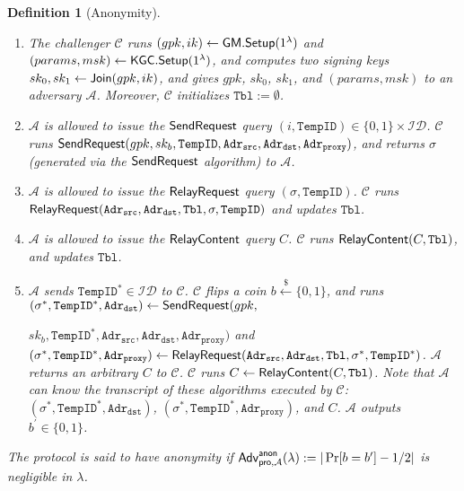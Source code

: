 \documentclass[preprint]{sig-alternate}
\newtheorem{definition}{Definition}[section]
\begin{document}
\begin{definition}[Anonymity]~\label{def:anon}
\begin{enumerate}
\setlength{\itemsep}{0em}\setlength{\parsep}{0em}
\item The challenger $\mathcal{C}$ runs $(gpk,ik)\leftarrow{\sf GM.Setup}(1^\lambda)$ and $(params,msk)\leftarrow {\sf KGC.Setup}(1^\lambda)$, and computes two signing keys $sk_0,sk_1\leftarrow {\sf Join}(gpk,ik)$, 
and gives $gpk$, $sk_0$, $sk_1$, and $(params,msk)$ to an adversary $\mathcal{A}$. Moreover, $\mathcal{C}$ initializes $\mathtt{Tbl}:=\emptyset$. 

\item $\mathcal{A}$ is allowed to issue the ${\sf SendRequest}$ query $(i,\mathtt{TempID})\allowbreak \in\{0,1\}\times\mathcal{ID}$. $\mathcal{C}$ runs ${\sf SendRequest}(gpk,\allowbreak sk_b,\mathtt{TempID},\allowbreak \mathtt{Adr_{src}},\allowbreak \mathtt{Adr_{dst}},\mathtt{Adr_{proxy}})$, and returns $\sigma$ (generated via the ${\sf SendRequest}$ algorithm) to $\mathcal{A}$. 

\item $\mathcal{A}$ is allowed to issue the ${\sf RelayRequest}$ query $(\sigma,\mathtt{TempID})$. $\mathcal{C}$ runs ${\sf RelayRequest}(\mathtt{Adr_{src}},\allowbreak \mathtt{Adr_{dst}},\allowbreak \mathtt{Tbl},\allowbreak \sigma, \mathtt{TempID})$ and updates $\mathtt{Tbl}$.  

\item $\mathcal{A}$ is allowed to issue the ${\sf RelayContent}$ query $C$. $\mathcal{C}$ runs ${\sf RelayContent}(C,\allowbreak \mathtt{Tbl})$, and updates $\mathtt{Tbl}$. 

\item $\mathcal{A}$ sends $\mathtt{TempID}^\ast\in\mathcal{ID}$ to $\mathcal{C}$. 
$\mathcal{C}$ flips a coin $b\stackrel{\$}{\leftarrow}\{0,1\}$, and runs $(\sigma^\ast,\mathtt{TempID}^\ast,\allowbreak \mathtt{Adr_{dst}})\leftarrow{\sf SendRequest}(gpk,$

\noindent$sk_b,\mathtt{TempID}^\ast,\mathtt{Adr_{src}},\allowbreak \mathtt{Adr_{dst}},\allowbreak \mathtt{Adr_{proxy}})$ and $(\sigma^\ast,\allowbreak \mathtt{TempID}^\ast,\allowbreak \mathtt{Adr_{proxy}})\leftarrow{\sf RelayRequest}(\mathtt{Adr_{src}},\allowbreak \mathtt{Adr_{dst}},\mathtt{Tbl},\allowbreak \sigma^\ast, \mathtt{TempID}^\ast)$. 
$\mathcal{A}$ returns an arbitrary $C$ to $\mathcal{C}$. 
$\mathcal{C}$ runs $C\leftarrow{\sf RelayContent}(C,\allowbreak \mathtt{Tbl})$. 
Note that $\mathcal{A}$ can know the transcript of these algorithms executed by $\mathcal{C}$: $(\sigma^\ast,\mathtt{TempID}^\ast,\mathtt{Adr_{dst}})$, $(\sigma^\ast,\allowbreak \mathtt{TempID}^\ast,\allowbreak \mathtt{Adr_{proxy}})$, and $C$. 
$\mathcal{A}$ outputs $b^\prime\in\{0,1\}$. 
\end{enumerate}

\noindent
The protocol is said to have anonymity if ${\sf Adv}^{{\sf anon}}_{{\sf pro},\mathcal{A}}(\lambda):=|\Pr[b=b^\prime]-1/2|$ is negligible in $\lambda$.
\end{definition}
\end{document}
